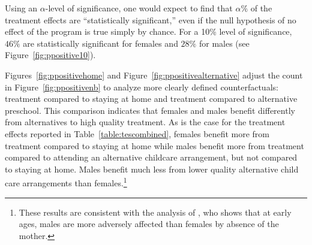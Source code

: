 Using an $\alpha$-level of significance, one would expect to find that $\alpha\%$ of the treatment effects are ``statistically significant,'' even if the null hypothesis of no effect of the program is true simply by chance. For a 10\% level of significance, $46\%$ are statistically significant for females and $28\%$ for males (see Figure~\ref{fig:ppositive10}).

Figures~\ref{fig:ppositivehome} and Figure~\ref{fig:ppositivealternative} adjust the count in Figure~\ref{fig:ppositivenb} to analyze more clearly defined counterfactuals: treatment compared to staying at home and treatment compared to alternative preschool. This comparison indicates that females and males benefit differently from alternatives to high quality treatment. As is the case for the treatment effects reported in Table~\ref{table:tescombined}, females benefit more from treatment compared to staying at home while males benefit more from treatment compared to attending an alternative childcare arrangement, but not compared to staying at home. Males benefit much less from lower quality alternative child care arrangements than females.\footnote{These results are consistent with the analysis of \citet{Rutter_1972_Maternal-Deprivation}, who shows that at early ages, males are more adversely affected than females by absence of the mother.}


